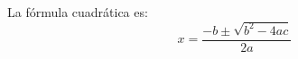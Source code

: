 \documentclass{article}
\begin{document}
La fórmula cuadrática es:
\[
x = \frac{-b \pm \sqrt{b^2 - 4ac}}{2a}
\]
\end{document}
